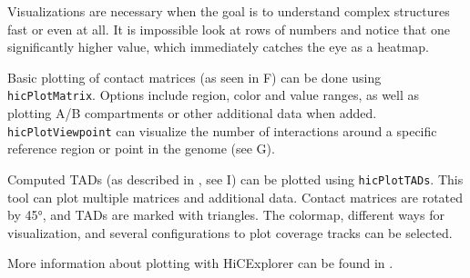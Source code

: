 %
%
%
%

Visualizations are necessary when the goal is to understand complex structures
fast or even at all. It is impossible look at rows of numbers and notice that
one significantly higher value, which immediately catches the eye as a heatmap.

Basic plotting of contact matrices (as seen in F) can be
done using \verb|hicPlotMatrix|. Options include region, color and value
ranges, as well as plotting A/B compartments or other additional data when
added. \verb|hicPlotViewpoint| can visualize the number of interactions around
a specific reference region or point in the genome (see G).

Computed TADs (as described in , see
I) can be plotted using \verb|hicPlotTADs|. This tool
can plot multiple matrices and additional data. Contact matrices are rotated
by 45°, and TADs are marked with triangles. The colormap, different ways for
visualization, and several configurations to plot coverage tracks can be
selected.

More information about plotting with HiCExplorer can be found in
\cite{wolff2018galaxy}.
